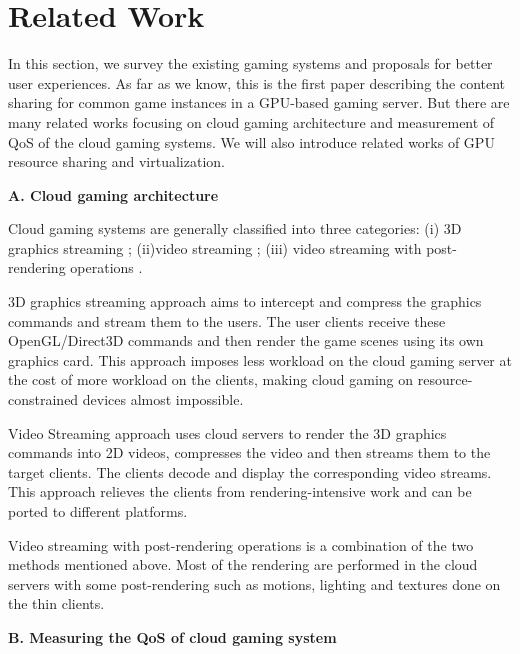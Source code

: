 \documentclass[pageno]{jpaper}
\begin{document}
\section{Related Work}\label{sec:related}

In this section, we survey the existing gaming systems and proposals for better user experiences.
As far as we know, this is the first paper describing the content sharing for common game instances in a GPU-based gaming server. But there are many related works focusing on cloud gaming architecture and measurement of QoS of the cloud gaming systems. We will also introduce related works of GPU resource sharing and virtualization.

\noindent \textbf{A. Cloud gaming architecture}

Cloud gaming systems are generally classified into three categories: (i) 3D graphics streaming \cite{related12} \cite{related19}; (ii)video streaming \cite{related42} \cite{related18}; (iii) video streaming with post-rendering operations \cite{related33} \cite{related16}.

3D graphics streaming approach aims to intercept and compress the graphics commands and stream them to the users. The user clients receive these OpenGL/Direct3D commands and then render the game scenes using its own graphics card. This approach imposes less workload on the cloud gaming server at the cost of more workload on the clients, making cloud gaming on resource-constrained devices almost impossible.

Video Streaming approach \cite{related42} \cite{related18} uses cloud servers to render the 3D graphics commands into 2D videos, compresses the video and then streams them to the target clients. The clients decode and display the corresponding video streams. This approach relieves the clients from rendering-intensive work and can be ported to different platforms.

Video streaming with post-rendering operations \cite{related33} \cite{related16} is a combination of the two methods mentioned above. Most of the rendering are performed in the cloud servers with some post-rendering such as motions, lighting and textures \cite{related6} done on the thin clients.

\noindent \textbf{B. Measuring the QoS of cloud gaming system}
\end{document}
